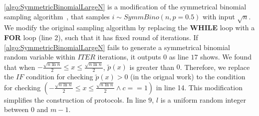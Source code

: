 \autoref{algo:SymmetricBinomialLargeN} is a modification of the symmetrical binomial sampling algorithm~\cite{googleDP2019}, that samples $i\sim SymmBino\left(n,p=0.5\right) $ with input $\sqrt{n}$. We modify the original sampling algorithm by replacing the \textbf{WHILE} loop with a \textbf{FOR} loop (line $2$), such that it has fixed round of iterations. If \autoref{algo:SymmetricBinomialLargeN} fails to generate a symmetrical binomial random variable within $ITER$ iterations, it outputs $0$ as line $17$ shows. We found that when $-\frac{\sqrt{n\ln n}}{2} \leq x \leq \frac{\sqrt{n\ln n}}{2}$, $\tilde{p}\left(x\right)$ is greater than $0$. Therefore, we replace the $IF$ condition for checking $\tilde{p}\left(x\right)>0$ (in the orignal work) to the condition for checking $\left(-\frac{\sqrt{n\ln n}}{2} \leq x \leq \frac{\sqrt{n\ln n}}{2} \land c==1\right) $ in line 14. This modification simplifies the construction of \smpc protocols. In line $9$, $l$ is a uniform random integer between $0$ and $m-1$.



